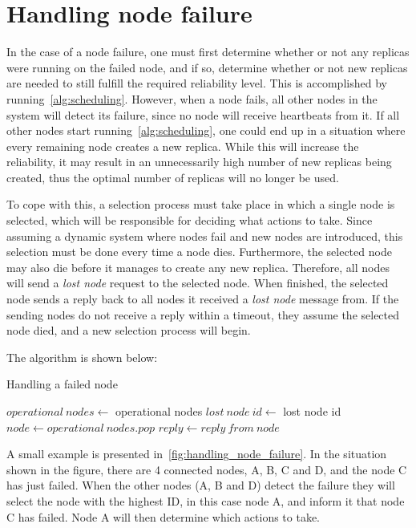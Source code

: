 \documentclass{cslthse-msc}
\begin{document}
\section{Handling node failure} \label{sec:design_handling_failure}
In the case of a node failure, one must first determine whether or not any replicas were running on the failed node, and if so, determine whether or not new replicas are needed to still fulfill the required reliability level. This is accomplished by running~\cref{alg:scheduling}. However, when a node fails, all other nodes in the system will detect its failure, since no node will receive heartbeats from it. If all other nodes start running~\cref{alg:scheduling}, one could end up in a situation where every remaining node creates a new replica. While this will increase the reliability, it may result in an unnecessarily high number of new replicas being created, thus the optimal number of replicas will no longer be used.

To cope with this, a selection process must take place in which a single node is selected, which will be responsible for deciding what actions to take. Since assuming a dynamic system where nodes fail and new nodes are introduced, this selection must be done every time a node dies. Furthermore, the selected node may also die before it manages to create any new replica. Therefore, all nodes will send a \emph{lost node} request to the selected node. When finished, the selected node sends a reply back to all nodes it received a \emph{lost node} message from. If the sending nodes do not receive a reply within a timeout, they assume the selected node died, and a new selection process will begin.

The algorithm is shown below:

\begin{algorithm}[!h]
	\caption{Handling a failed node} \label{alg:node_failure}
	\begin{algorithmic}[1]
	\State $operational\ nodes\gets $ operational nodes
	\State $lost\ node\ id\gets $ lost node id
	\State
	\Do
		\State $node\gets operational\ nodes.pop$
		\State
		\State $reply\gets reply\ from\ node$
	\end{algorithmic}
\end{algorithm}

A small example is presented in~\cref{fig:handling_node_failure}. In the situation shown in the figure, there are 4 connected nodes, A, B, C and D, and the node C has just failed. When the other nodes (A, B and D) detect the failure they will select the node with the highest ID, in this case node A, and inform it that node C has failed. Node A will then determine which actions to take.
\end{document}
